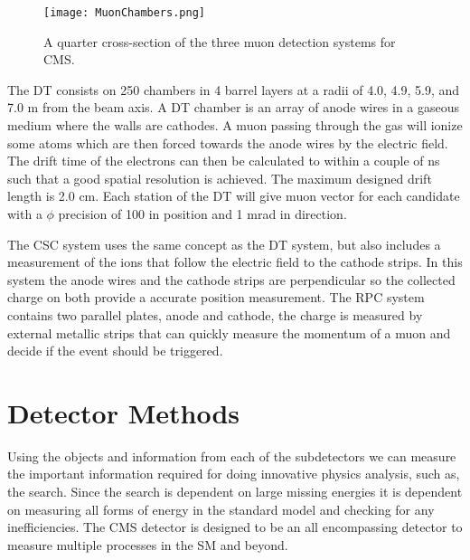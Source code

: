 \begin{figure}
 	\centering
	\texttt{[image: MuonChambers.png]}
 	\caption[Muon Chambers]{A quarter cross-section of the three muon detection systems for CMS. }
 	\label{MuonChambers} 
\end{figure}

The DT consists on 250 chambers in 4 barrel layers at a radii of 4.0, 4.9, 5.9, and 7.0 m from the beam axis. A DT chamber is an array of anode wires in a gaseous medium where the walls are cathodes. A muon passing through the gas will ionize some atoms which are then forced towards the anode wires by the electric field. The drift time of the electrons can then be calculated to within a couple of ns such that a good spatial resolution is achieved. The maximum designed drift length is 2.0 cm. Each station of the DT will give muon vector for each candidate with a $\phi$ precision of 100 \mum{} in position and 1 mrad in direction. 

The CSC system uses the same concept as the DT system, but also includes a measurement of the ions that follow the electric field to the cathode strips. In this system the anode wires and the cathode strips are perpendicular so the collected charge on both provide a accurate position measurement. The RPC system contains two parallel plates, anode and cathode, the charge is measured by external metallic strips that can quickly measure the momentum of a muon and decide if the event should be triggered.

\section{Detector Methods}
\label{sec:DetMethods}

Using the objects and information from each of the subdetectors we can measure the important information required for doing innovative physics analysis, such as, the \st{} search. Since the search is dependent on large missing energies it is dependent on measuring all forms of energy in the standard model and checking for any inefficiencies. The CMS detector is designed to be an all encompassing detector to measure multiple processes in the SM and beyond. 